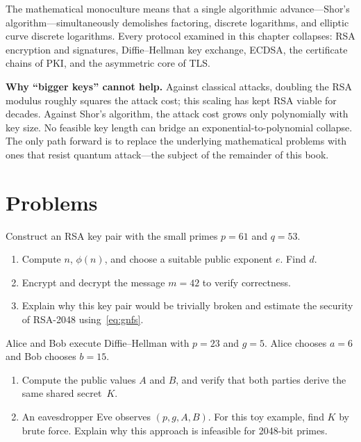 The mathematical monoculture means that a single algorithmic advance---Shor's algorithm---simultaneously demolishes factoring, discrete logarithms, and elliptic curve discrete logarithms.  Every protocol examined in this chapter collapses: RSA encryption and signatures, Diffie--Hellman key exchange, ECDSA, the certificate chains of PKI, and the asymmetric core of TLS.

\begin{svgraybox}
\textbf{Why ``bigger keys'' cannot help.}
Against classical attacks, doubling the RSA modulus roughly squares the attack cost; this scaling has kept RSA viable for decades.  Against Shor's algorithm, the attack cost grows only polynomially with key size.  No feasible key length can bridge an exponential-to-polynomial collapse.  The only path forward is to replace the underlying mathematical problems with ones that resist quantum attack---the subject of the remainder of this book.
\end{svgraybox}


\section*{Problems}

\begin{prob}
\label{prob:ch03-rsa}
Construct an RSA key pair with the small primes $p = 61$ and $q = 53$.
\begin{enumerate}
\item[(a)] Compute $n$, $\phi(n)$, and choose a suitable public exponent $e$.  Find $d$.
\item[(b)] Encrypt and decrypt the message $m = 42$ to verify correctness.
\item[(c)] Explain why this key pair would be trivially broken and estimate the security of RSA-2048 using~\eqref{eq:gnfs}.
\end{enumerate}
\end{prob}

\begin{prob}
\label{prob:ch03-dh}
Alice and Bob execute Diffie--Hellman with $p = 23$ and $g = 5$.  Alice chooses $a = 6$ and Bob chooses $b = 15$.
\begin{enumerate}
\item[(a)] Compute the public values $A$ and $B$, and verify that both parties derive the same shared secret~$K$.
\item[(b)] An eavesdropper Eve observes $(p, g, A, B)$.  For this toy example, find $K$ by brute force.  Explain why this approach is infeasible for 2048-bit primes.
\end{enumerate}
\end{prob}


